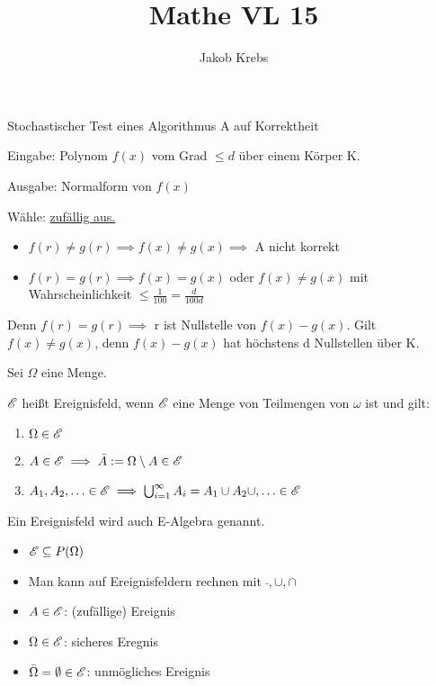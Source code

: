 \documentclass{../tudscript}
\title{Mathe VL 15}
\author{Jakob Krebs}
\begin{document}
Stochastischer Test eines Algorithmus A auf Korrektheit

Eingabe: Polynom $f(x)$ vom Grad $\leq d$ über einem Körper K.

Ausgabe: Normalform von $f(x)$


Wähle:
\underline{zufällig aus.}

\begin{itemize}

\item $f(r) \neq g(r) \implies f(x) \neq g(x) \implies$ A nicht korrekt
\item $f(r) = g(r) \implies f(x) = g(x)$ oder $f(x) \neq g(x)$ mit Wahrscheinlichkeit $\leq \frac{1}{100} = \frac{d}{100d}$

\end{itemize}

Denn $f(r) = g(r) \implies$ r ist Nullstelle von $f(x) - g(x)$. Gilt $f(x) \neq g(x)$, denn $f(x) - g(x)$ hat höchstens d Nullstellen über K.

Sei $\Omega$ eine Menge.

$\mathscr{E}$ heißt Ereignisfeld, wenn $\mathscr{E}$ eine Menge von Teilmengen von $\omega$ ist und gilt:

\begin{enumerate}
\item $\Omega \in \mathscr{E}$
\item $A \in \mathscr{E} \implies \bar{A} := \Omega \setminus A \in \mathscr{E}$
\item $A_1, A_2, \ldots \in \mathscr{E} \implies \bigcup_{i = 1}^{\infty} A_i = A_1 \cup A_2 \cup, \ldots \in \mathscr{E}$
\end{enumerate}

Ein Ereignisfeld wird auch E-Algebra genannt.

\begin{itemize}
\item $\mathscr{E} \subseteq P(\Omega)$
\item Man kann auf Ereignisfeldern rechnen mit $\bar{}, \cup, \cap$
\end{itemize}

\begin{itemize}
\item $A \in \mathscr{E}$: (zufällige) Ereignis
\item $\Omega \in \mathscr{E}$: sicheres Eregnis
\item $\bar{\Omega} = \emptyset \in \mathscr{E}$: unmögliches Ereignis
\end{itemize}
\end{document}
